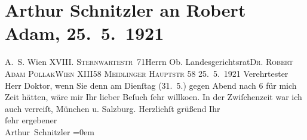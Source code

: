

         
         \renewcommand{\erwaehntePersonen}{Personen: Robert Adam}
         \renewcommand{\erwaehnteInstitutionen}{Institutionen: Amerikanische Kinderhilfsaktion}
         \renewcommand{\erwaehnteOrte}{Orte: Elisabethstraße, I., Innere Stadt, Meidlinger Hauptstraße, München, Salzburg, Sternwartestraße, Wien, XIII., Hietzing, Österreich}
         \renewcommand{\erwaehnteWerke}{}
               \section[Arthur Schnitzler an Robert Adam, 25. 5. 1921]{ Arthur Schnitzler an Robert Adam, 25. 5. 1921}\nopagebreak{}\rehead{ }\begin{ledgroupsized}[t]{13cm}\normalsize\beginnumbering \toendnotes[C]{\smallbreak\pagebreak[2]} 
\pstart{}{\pb}A. S. Wien XVIII. \textsc{Sternwartestr} 71\pend{}{\bigskip}\pstart{}Herrn Ob. Landesgerichtsrat\pend{}\pstart{}\textsc{Dr. Robert Adam Pollak}\pend{}\pstart{}\textsc{Wien XIII}\pend{}\pstart{}58 \textsc{Meidlinger Hauptstr}
                     58\pend{}{\bigskip}\pstart
           \raggedleft{}{\pb}25. 5. 1921\pend
           \pstart{}Verehrtester Herr Doktor,\pend\pstart
           wenn Sie denn am Dienſtag (31. 5.) gegen Abend nach 6 für
               mich Zeit hätten, wäre mir Ihr lieber Beſuch ſehr willko{\geminationm}en. In der Zwiſchenzeit war ich auch verreiſt, München u. Salzburg.\pend
           \pstart
           Herzlichſt grüßend Ihr{\\[\baselineskip]}ſehr ergebener{\\[\baselineskip]}\spacefill\mbox{Arthur Schnitzler}\pend
           \leftskip=0em{}
         
         \endnumbering{}\end{ledgroupsized}  \newcommand{\dateiname}{L02368}\newcommand{\titel}{Arthur Schnitzler an Robert Adam, 25. 5. 1921}\newcommand{\editorInnen}{Martin Anton Müller und Gerd-Hermann Susen}
      